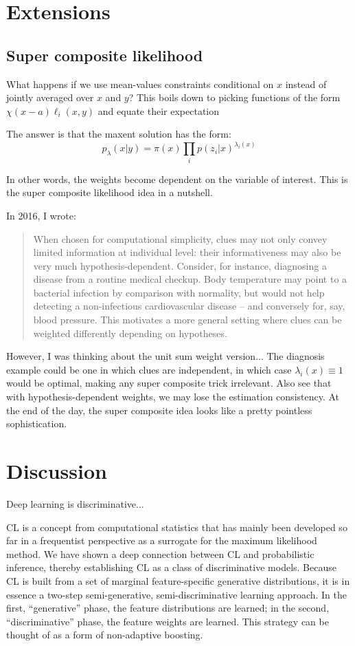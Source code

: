 \documentclass[english]{scrartcl}
\begin{document}
\section{Extensions}

\subsection{Super composite likelihood}
\label{sec:super}

What happens if we use mean-values constraints conditional on $x$ instead of jointly averaged over $x$ and $y$? This boils down to picking functions of the form $\chi(x-a)\ell_i(x,y)$ and equate their expectation

The answer is that the maxent solution has the form:
$$
p_\lambda(x|y) = \pi(x) \prod_i p(z_i|x)^{\lambda_i(x)}
$$

In other words, the weights become dependent on the variable of interest. This is the super composite likelihood idea in a nutshell.

In 2016, I wrote:
\begin{quote}
When chosen for computational simplicity, clues may not only convey limited information at individual level: their informativeness may also be very much hypothesis-dependent. Consider, for instance, diagnosing a disease from a routine medical checkup. Body temperature may point to a bacterial infection by comparison with normality, but would not help detecting a non-infectious cardiovascular disease -- and conversely for, say, blood pressure.
This motivates a more general setting where clues can be weighted differently depending on hypotheses.
\end{quote}

However, I was thinking about the unit sum weight version... The diagnosis example could be one in which clues are independent, in which case $\lambda_i(x)\equiv 1$ would be optimal, making any super composite trick irrelevant. Also see that with hypothesis-dependent weights, we may lose the estimation consistency. At the end of the day, the super composite idea looks like a pretty pointless sophistication.



\section{Discussion}
\label{sec:discussion}

Deep learning is discriminative...

CL is a concept from computational statistics that has mainly been developed so far in a frequentist perspective as a surrogate for the maximum likelihood method. We have shown a deep connection between CL and probabilistic inference, thereby establishing CL as a class of discriminative models. Because CL is built from a set of marginal feature-specific generative distributions, it is in essence a two-step semi-generative, semi-discriminative learning approach. In the first, ``generative'' phase, the feature distributions are learned; in the second, ``discriminative'' phase, the feature weights are learned. This strategy can be thought of as a form of non-adaptive boosting.
\end{document}
